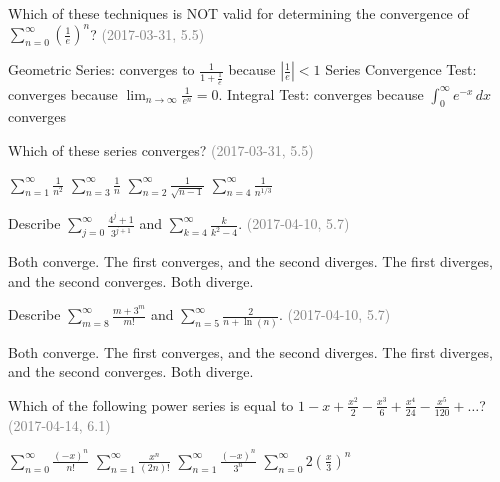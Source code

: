 \documentclass[12pt]{exam}
\newcommand{\questionDate}[1]{\textcolor{gray}{(#1)}}
\newcommand{\<}{\langle}
\renewcommand{\>}{\rangle}
\begin{document}
\begin{questions}
\newpage

\question
Which of these techniques is NOT valid for determining the convergence
of \(\displaystyle\sum_{n=0}^\infty \left(\frac{1}{e}\right)^n\)?
\questionDate{2017-03-31, 5.5}
\begin{choices}
\choice
  Geometric Series: converges to \(\frac{1}{1+\frac{1}{e}}\)
  because \(|\frac{1}{e}|<1\)
\CorrectChoice
  Series Convergence Test: converges because
  \(\displaystyle\lim_{n\to\infty}\frac{1}{e^n}=0\).
\choice
  Integral Test: converges because \(\int_0^\infty e^{-x}\,dx\) converges
\end{choices}

\question
Which of these series converges?
\questionDate{2017-03-31, 5.5}
\begin{choices}
\CorrectChoice
  \(\displaystyle\sum_{n=1}^\infty\frac{1}{n^2}\)
\choice
  \(\displaystyle\sum_{n=3}^\infty\frac{1}{n}\)
\choice
  \(\displaystyle\sum_{n=2}^\infty\frac{1}{\sqrt{n-1}}\)
\choice
  \(\displaystyle\sum_{n=4}^\infty\frac{1}{n^{1/3}}\)
\end{choices}


\newpage

\question
Describe \(\displaystyle\sum_{j=0}^\infty\frac{4^j+1}{3^{j+1}}\) and
\(\displaystyle\sum_{k=4}^\infty\frac{k}{k^2-4}\).
\questionDate{2017-04-10, 5.7}
\begin{choices}
\choice
  Both converge.
\choice
  The first converges, and the second diverges.
\choice
  The first diverges, and the second converges.
\CorrectChoice
  Both diverge.
\end{choices}

\question
Describe \(\displaystyle\sum_{m=8}^\infty\frac{m+3^m}{m!}\) and
\(\displaystyle\sum_{n=5}^\infty\frac{2}{n+\ln(n)}\).
\questionDate{2017-04-10, 5.7}
\begin{choices}
\choice
  Both converge.
\CorrectChoice
  The first converges, and the second diverges.
\choice
  The first diverges, and the second converges.
\choice
  Both diverge.
\end{choices}


\newpage

\question
Which of the following power series is equal to
\(1-x+\frac{x^2}{2}-\frac{x^3}{6}+\frac{x^4}{24}-\frac{x^5}{120}+\dots\)?
\questionDate{2017-04-14, 6.1}
\begin{choices}
\CorrectChoice
  \(\sum_{n=0}^\infty\frac{(-x)^n}{n!}\)
\choice
  \(\sum_{n=1}^\infty\frac{x^n}{(2n)!}\)
\choice
  \(\sum_{n=1}^\infty\frac{(-x)^n}{3^n}\)
\choice
  \(\sum_{n=0}^\infty2(\frac{x}{3})^n\)
\end{choices}


\end{questions}
\end{document}
